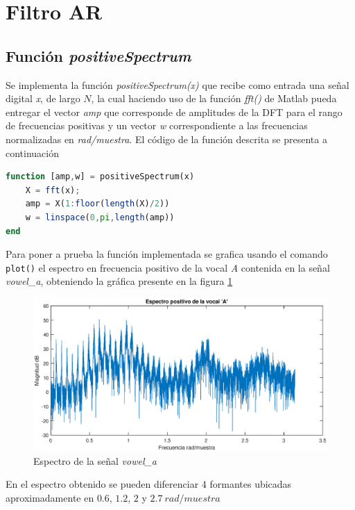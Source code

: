 \section{Filtro AR}

\subsection{Función \textit{positiveSpectrum}}

Se implementa la función \textit{positiveSpectrum(x)} que recibe como entrada una señal digital \textit{x}, de largo $N$, la cual haciendo uso de la función \textit{fft()}  de Matlab pueda entregar el vector \textit{amp} que corresponde  de amplitudes de la DFT  para el rango de frecuencias positivas y un vector \textit{w} correspondiente a las frecuencias normalizadas en \textit{rad/muestra}. El código de la función descrita se presenta a continuación


\begin{lstlisting}[language = octave]
function [amp,w] = positiveSpectrum(x)
    X = fft(x);
    amp = X(1:floor(length(X)/2))
    w = linspace(0,pi,length(amp))
end

\end{lstlisting}

Para poner a prueba la función implementada se grafica usando el comando  \texttt{plot()} el espectro en frecuencia positivo de la vocal \textit{A} contenida en la señal \textit{vowel\_a}, obteniendo la gráfica presente en la figura \ref{frec_A_positive}

\begin{figure}[H]
    \centering
    \includegraphics[scale = 0.5]{figures/4_1_espectroA.eps}
    \caption{Espectro de la señal \textit{vowel\_a}}
    \label{frec_A_positive}
\end{figure}

En el espectro obtenido se pueden diferenciar 4 formantes ubicadas aproximadamente en $0.6$, $1.2$, $2$ y $2.7 ~rad/muestra$ 
